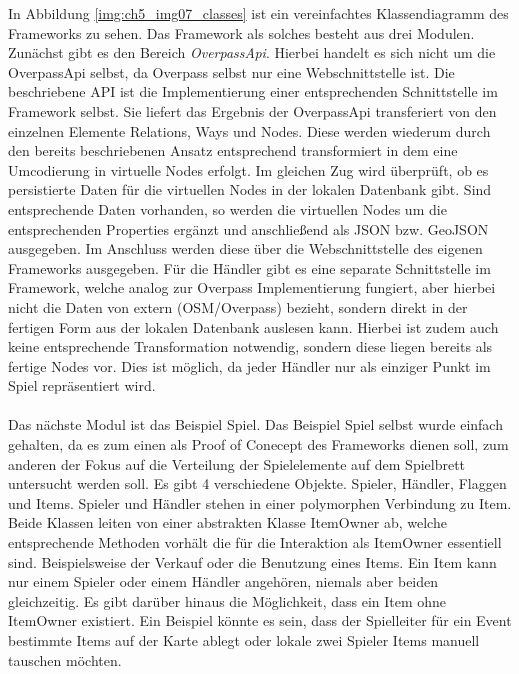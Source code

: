 In Abbildung \ref{img:ch5_img07_classes} ist ein vereinfachtes Klassendiagramm des Frameworks zu sehen. Das Framework als solches besteht aus drei Modulen. Zunächst gibt es den Bereich \textit{OverpassApi}. Hierbei handelt es sich nicht um die OverpassApi selbst, da Overpass selbst nur eine Webschnittstelle ist. Die beschriebene API ist die Implementierung einer entsprechenden Schnittstelle im Framework selbst. Sie liefert das Ergebnis der OverpassApi transferiert von den einzelnen Elemente Relations, Ways und Nodes. Diese werden wiederum durch den bereits beschriebenen Ansatz entsprechend transformiert in dem eine Umcodierung in virtuelle Nodes erfolgt. Im gleichen Zug wird überprüft, ob es persistierte Daten für die virtuellen Nodes in der lokalen Datenbank gibt. Sind entsprechende Daten vorhanden, so werden die virtuellen Nodes um die entsprechenden Properties ergänzt und anschließend als JSON bzw. GeoJSON ausgegeben.
Im Anschluss werden diese über die Webschnittstelle des eigenen Frameworks ausgegeben.
Für die Händler gibt es eine separate Schnittstelle im Framework, welche analog zur Overpass Implementierung fungiert, aber hierbei nicht die Daten von extern (OSM/Overpass) bezieht, sondern direkt in der fertigen Form aus der lokalen Datenbank auslesen kann. Hierbei ist zudem auch keine entsprechende Transformation notwendig, sondern diese liegen bereits als fertige Nodes vor. Dies ist möglich, da jeder Händler nur als einziger Punkt im Spiel repräsentiert wird.
\\\\
Das nächste Modul ist das Beispiel Spiel. Das Beispiel Spiel selbst wurde einfach gehalten, da es zum einen als Proof of Conecept des Frameworks dienen soll, zum anderen der Fokus auf die Verteilung der Spielelemente auf dem Spielbrett untersucht werden soll.
Es gibt 4 verschiedene Objekte. Spieler, Händler, Flaggen und Items.
Spieler und Händler stehen in einer polymorphen Verbindung zu Item. Beide Klassen leiten von einer abstrakten Klasse ItemOwner ab, welche entsprechende Methoden vorhält die für die Interaktion als ItemOwner essentiell sind. Beispielsweise der Verkauf oder die Benutzung eines Items. Ein Item kann nur einem Spieler oder einem Händler angehören, niemals aber beiden gleichzeitig. Es gibt darüber hinaus die Möglichkeit, dass ein Item ohne ItemOwner existiert. Ein Beispiel könnte es sein, dass der Spielleiter für ein Event bestimmte Items auf der Karte ablegt oder lokale zwei Spieler Items manuell tauschen möchten.
\\\\
